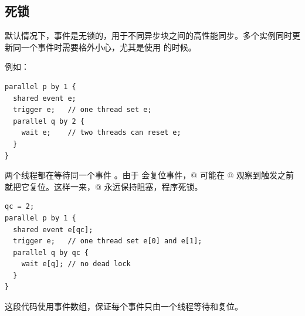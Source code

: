 \subsection*{死锁}

默认情况下，事件是无锁的，用于不同异步块之间的高性能同步。多个实例同时更新同一个事件时需要格外小心，尤其是使用 \co@wait@ 的时候。

例如：

\begin{lstlisting}[language=croqtile,caption={单实例死锁}]
parallel p by 1 {
  shared event e;
  trigger e;   // one thread set e;
  parallel q by 2 {
    wait e;    // two threads can reset e;
  }
}
\end{lstlisting}

两个线程都在等待同一个事件 \co@e@。由于 \co@wait@ 会复位事件，@ 可能在 @ 观察到触发之前就把它复位。这样一来，@ 永远保持阻塞，程序死锁。

\begin{lstlisting}[language=croqtile,caption={一个触发、两个等待者}]
qc = 2;
parallel p by 1 {
  shared event e[qc];
  trigger e;   // one thread set e[0] and e[1];
  parallel q by qc {
    wait e[q]; // no dead lock
  }
}
\end{lstlisting}

这段代码使用事件数组，保证每个事件只由一个线程等待和复位。
